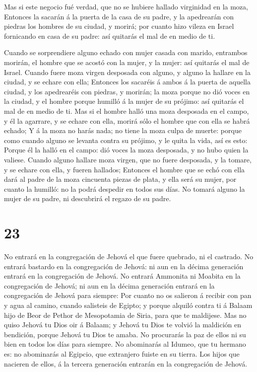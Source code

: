  Mas si este negocio fué verdad, que no se hubiere hallado
virginidad en la moza,  Entonces la sacarán á la puerta de
la casa de su padre, y la apedrearán con piedras los hombres de su
ciudad, y morirá; por cuanto hizo vileza en Israel fornicando en casa de
su padre: así quitarás el mal de en medio de ti.

 Cuando se sorprendiere alguno echado con mujer casada con
marido, entrambos morirán, el hombre que se acostó con la mujer, y la
mujer: así quitarás el mal de Israel.  Cuando fuere moza
virgen desposada con alguno, y alguno la hallare en la ciudad, y se
echare con ella;  Entonces los sacaréis á ambos á la puerta
de aquella ciudad, y los apedrearéis con piedras, y morirán; la moza
porque no dió voces en la ciudad, y el hombre porque humilló á la mujer
de su prójimo: así quitarás el mal de en medio de ti.  Mas
si el hombre halló una moza desposada en el campo, y él la agarrare, y
se echare con ella, morirá sólo el hombre que con ella se habrá echado;
 Y á la moza no harás nada; no tiene la moza culpa de
muerte: porque como cuando alguno se levanta contra su prójimo, y le
quita la vida, así es esto:  Porque él la halló en el
campo: dió voces la moza desposada, y no hubo quien la valiese.
 Cuando alguno hallare moza virgen, que no fuere desposada,
y la tomare, y se echare con ella, y fueren hallados; 
Entonces el hombre que se echó con ella dará al padre de la moza
cincuenta piezas de plata, y ella será su mujer, por cuanto la humilló:
no la podrá despedir en todos sus días.  No tomará alguno
la mujer de su padre, ni descubrirá el regazo de su padre.

\hypertarget{section-22}{%
\section{23}\label{section-22}}

 No entrará en la congregación de Jehová el que fuere
quebrado, ni el castrado.  No entrará bastardo en la
congregación de Jehová: ni aun en la décima generación entrará en la
congregación de Jehová.  No entrará Ammonita ni Moabita en
la congregación de Jehová; ni aun en la décima generación entrará en la
congregación de Jehová para siempre:  Por cuanto no os
salieron á recibir con pan y agua al camino, cuando salisteis de Egipto;
y porque alquiló contra ti á Balaam hijo de Beor de Pethor de
Mesopotamia de Siria, para que te maldijese.  Mas no quiso
Jehová tu Dios oir á Balaam; y Jehová tu Dios te volvió la maldición en
bendición, porque Jehová tu Dios te amaba.  No procurarás la
paz de ellos ni su bien en todos los días para siempre.  No
abominarás al Idumeo, que tu hermano es: no abominarás al Egipcio, que
extranjero fuiste en su tierra.  Los hijos que nacieren de
ellos, á la tercera generación entrarán en la congregación de Jehová.

